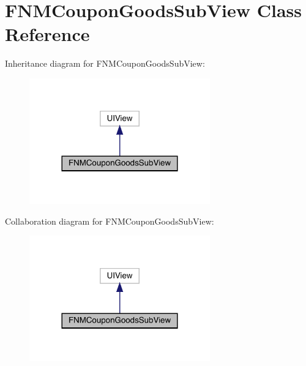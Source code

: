 \hypertarget{interface_f_n_m_coupon_goods_sub_view}{}\section{F\+N\+M\+Coupon\+Goods\+Sub\+View Class Reference}
\label{interface_f_n_m_coupon_goods_sub_view}


Inheritance diagram for F\+N\+M\+Coupon\+Goods\+Sub\+View\+:\nopagebreak
\begin{figure}[H]
\begin{center}
\leavevmode
\includegraphics[width=221pt]{interface_f_n_m_coupon_goods_sub_view__inherit__graph}
\end{center}
\end{figure}


Collaboration diagram for F\+N\+M\+Coupon\+Goods\+Sub\+View\+:\nopagebreak
\begin{figure}[H]
\begin{center}
\leavevmode
\includegraphics[width=221pt]{interface_f_n_m_coupon_goods_sub_view__coll__graph}
\end{center}
\end{figure}
